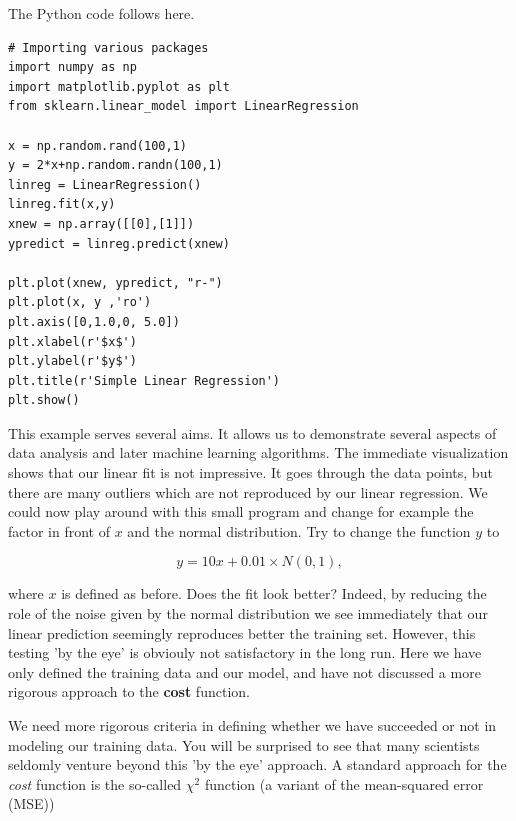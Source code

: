 \documentclass{beamer}
\begin{document}
\begin{frame}
The Python code follows here.




















\begin{verbatim}
# Importing various packages
import numpy as np
import matplotlib.pyplot as plt
from sklearn.linear_model import LinearRegression

x = np.random.rand(100,1)
y = 2*x+np.random.randn(100,1)
linreg = LinearRegression()
linreg.fit(x,y)
xnew = np.array([[0],[1]])
ypredict = linreg.predict(xnew)

plt.plot(xnew, ypredict, "r-")
plt.plot(x, y ,'ro')
plt.axis([0,1.0,0, 5.0])
plt.xlabel(r'$x$')
plt.ylabel(r'$y$')
plt.title(r'Simple Linear Regression')
plt.show()

\end{verbatim}


This example serves several aims. It allows us to demonstrate several
aspects of data analysis and later machine learning algorithms. The
immediate visualization shows that our linear fit is not
impressive. It goes through the data points, but there are many
outliers which are not reproduced by our linear regression.  We could
now play around with this small program and change for example the
factor in front of $x$ and the normal distribution.  Try to change the
function $y$ to

\[
y = 10x+0.01 \times N(0,1),
\]

where $x$ is defined as before.  Does the fit look better? Indeed, by
reducing the role of the noise given by the normal distribution we see immediately that
our linear prediction seemingly reproduces better the training
set. However, this testing 'by the eye' is obviouly not satisfactory in the
long run. Here we have only defined the training data and our model, and 
have not discussed a more rigorous approach to the \textbf{cost} function.

We need more rigorous criteria in defining whether we have succeeded or
not in modeling our training data.  You will be surprised to see that
many scientists seldomly venture beyond this 'by the eye' approach. A
standard approach for the \emph{cost} function is the so-called $\chi^2$
function (a variant of the mean-squared error (MSE))


\end{frame}
\end{document}
